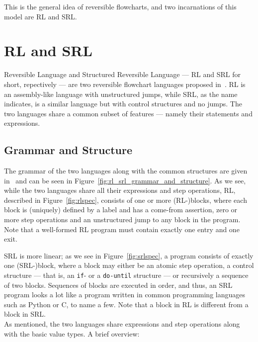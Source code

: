 
\noindent This is the general idea of reversible flowcharts, and two incarnations of this model are RL and SRL.\



\section*{RL and SRL}
%
\noindent Reversible Language and Structured Reversible Language --- RL and SRL for short, repectively --- are two reversible flowchart languages proposed in~\cite{REV}. RL is an assembly-like language with unstructured jumps, while SRL, as the name indicates, is a similar language but with control structures and no jumps. The two languages share a common subset of features --- namely their statements and expressions.

\subsection*{Grammar and Structure}

The grammar of the two languages along with the common structures are given in~\cite{REV} and can be seen in Figure~\ref{fig:rl_srl_grammar_and_structure}. As we see, while the two languages share all their expressions and step operations, RL, described in Figure~\ref{fig:rlspec}, consists of one or more (RL-)blocks, where each block is (uniquely) defined by a label and has a come-from assertion, zero or more step operations and an unstructured jump to any block in the program. Note that a well-formed RL program must contain exactly one entry and one exit.

SRL is more linear; as we see in Figure~\ref{fig:srlspec}, a program consists of exactly one (SRL-)block, where a block may either be an atomic step operation, a control structure --- that is, an \texttt{if}- or a \texttt{do-until} structure --- or recursively a sequence of two blocks. Sequences of blocks are executed in order, and thus, an SRL program looks a lot like a program written in common programming languages such as Python or C, to name a few. Note that a block in RL is different from a block in SRL.\\

\noindent As mentioned, the two languages share expressions and step operations along with the basic value types. A brief overview:

